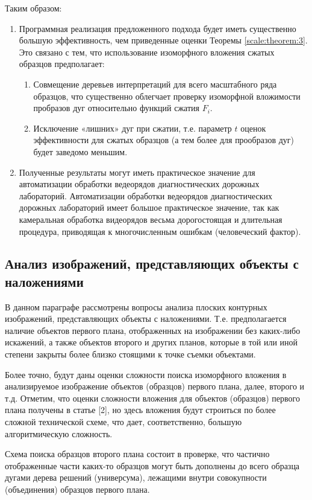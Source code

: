 Таким образом:
\begin{enumerate}
\item  Программная реализация предложенного подхода будет иметь существенно большую эффективность, чем приведенные оценки  Теоремы \ref{scale:theorem:3}. Это связано с тем, что использование изоморфного вложения сжатых образцов предполагает:
\begin{enumerate}
\item Совмещение деревьев интерпретаций для всего масштабного ряда образцов, что существенно облегчает проверку изоморфной вложимости пробразов дуг относительно функций сжатия $F_i$. 
\item Исключение «лишних» дуг при сжатии, т.е. параметр $t$ оценок эффективности  для сжатых образцов (а тем более для прообразов дуг) будет заведомо меньшим.  
\end{enumerate}
\item Полученные результаты могут иметь практическое значение для автоматизации обработки ведеорядов диагностических дорожных лабораторий.  Автоматизации обработки ведеорядов диагностических дорожных лабораторий имеет большое практическое значение, так как камеральная обработка видеорядов весьма дорогостоящая и длительная процедура, приводящая к многочисленным ошибкам (человеческий фактор).  
\end{enumerate}


\subsection{Анализ изображений, представляющих объекты с наложениями}

В данном параграфе рассмотрены вопросы анализа плоских контурных изображений, представляющих объекты с наложениями. Т.е. предполагается наличие объектов первого плана, отображенных на изображении без каких-либо искажений,  а также объектов второго и других планов, которые в той или иной степени закрыты более близко стоящими к точке съемки объектами.

Более точно, будут даны оценки сложности поиска изоморфного вложения в анализируемое изображение объектов (образцов) первого плана, далее, второго и т.д. Отметим, что оценки сложности вложения для объектов (образцов) первого плана получены в статье  [2], но здесь вложения будут строиться по более сложной технической схеме, что дает, соответственно,  большую алгоритмическую сложность.

Схема поиска образцов второго плана состоит в проверке, что частично отображенные части каких-то образцов могут быть дополнены до всего образца дугами дерева решений (универсума), лежащими внутри  совокупности (объединения) образцов первого плана.

